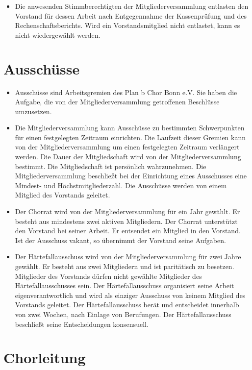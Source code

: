 \documentclass[12pt,paper=a4,ngerman]{report}
\begin{document}
\begin{itemize}
    \item Die anwesenden Stimmberechtigten der Mitgliederversammlung entlasten den Vorstand für dessen Arbeit nach Entgegennahme der Kassenprüfung und des Rechenschaftsberichts. Wird ein Vorstandsmitglied nicht entlastet, kann es nicht wiedergewählt werden.
\end{itemize}

\section{Ausschüsse}

\begin{itemize}
    \item Ausschüsse sind Arbeitsgremien des Plan b Chor Bonn e.V. Sie haben die Aufgabe, die von der Mitgliederversammlung getroffenen Beschlüsse umzusetzen.
    \item Die Mitgliederversammlung kann Ausschüsse zu bestimmten Schwerpunkten für einen festgelegten Zeitraum einrichten. Die Laufzeit dieser Gremien kann von der Mitgliederversammlung um einen festgelegten Zeitraum verlängert werden. Die Dauer der Mitgliedschaft wird von der Mitgliederversammlung bestimmt. Die Mitgliedschaft ist persönlich wahrzunehmen. Die Mitgliederversammlung beschließt bei der Einrichtung eines Ausschusses eine Mindest- und Höchstmitgliederzahl. Die Ausschüsse werden von einem Mitglied des Vorstands geleitet.
    \item Der Chorrat wird von der Mitgliederversammlung für ein Jahr gewählt. Er besteht aus mindestens zwei aktiven Mitgliedern. Der Chorrat unterstützt den Vorstand bei seiner Arbeit. Er entsendet ein Mitglied in den Vorstand. Ist der Ausschuss vakant, so übernimmt der Vorstand seine Aufgaben.
    \item Der Härtefallausschuss wird von der Mitgliederversammlung für zwei Jahre gewählt. Er besteht aus zwei Mitgliedern und ist paritätisch zu besetzen. Mitglieder des Vorstands dürfen nicht gewählte Mitglieder des Härtefallausschusses sein. Der Härtefallausschuss organisiert seine Arbeit eigenverantwortlich und wird als einziger Ausschuss von keinem Mitglied des Vorstands geleitet. Der Härtefallausschuss berät und entscheidet innerhalb von zwei Wochen, nach Einlage von Berufungen. Der Härtefallausschuss beschließt seine Entscheidungen konsensuell.
\end{itemize}

\section{Chorleitung}
\end{document}
